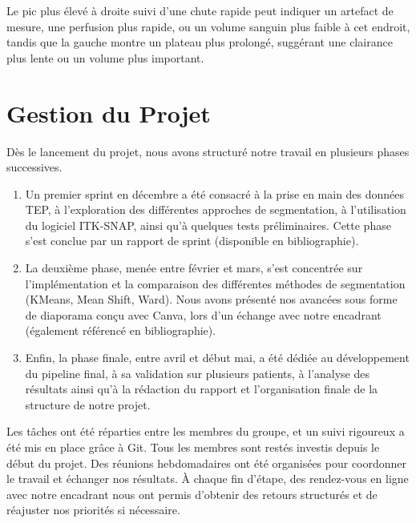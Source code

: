 \documentclass{article}
\begin{document}
        Le pic plus élevé à droite suivi d’une chute rapide peut indiquer un artefact de mesure, une perfusion plus rapide, ou un volume sanguin plus faible à cet endroit, tandis que la gauche montre un plateau plus prolongé, suggérant une clairance plus lente ou un volume plus important.\\


    

\newpage
\section{Gestion du Projet}

    \noindent
    Dès le lancement du projet, nous avons structuré notre travail en plusieurs phases successives.
    
    \begin{enumerate}
        \item Un premier sprint en décembre a été consacré à la prise en main des données TEP, à l’exploration des différentes approches de segmentation, à l’utilisation du logiciel ITK-SNAP, ainsi qu’à quelques tests préliminaires. Cette phase s’est conclue par un rapport de sprint (disponible en bibliographie).
        \item La deuxième phase, menée entre février et mars, s’est concentrée sur l’implémentation et la comparaison des différentes méthodes de segmentation (KMeans, Mean Shift, Ward). Nous avons présenté nos avancées sous forme de diaporama conçu avec Canva, lors d’un échange avec notre encadrant (également référencé en bibliographie).
        \item Enfin, la phase finale, entre avril et début mai, a été dédiée au développement du pipeline final, à sa validation sur plusieurs patients, à l'analyse des résultats ainsi qu’à la rédaction du rapport et l'organisation finale de la structure de notre projet.
    \end{enumerate}
    
    \noindent
    Les tâches ont été réparties entre les membres du groupe, et un suivi rigoureux a été mis en place grâce à Git. Tous les membres sont restés investis depuis le début du projet. Des réunions hebdomadaires ont été organisées pour coordonner le travail et échanger nos résultats. À chaque fin d’étape, des rendez-vous en ligne avec notre encadrant nous ont permis d’obtenir des retours structurés et de réajuster nos priorités si nécessaire.
    
\end{document}
